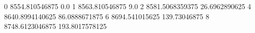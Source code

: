 0 8554.810546875 0.0
1 8563.810546875 9.0
2 8581.5068359375 26.6962890625
4 8640.8994140625 86.0888671875
6 8694.541015625 139.73046875
8 8748.6123046875 193.8017578125
